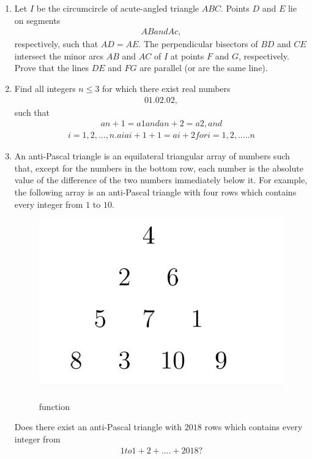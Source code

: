 \documentclass[12pt,-letter paper]{article}
\begin{document}
\begin{enumerate}
	\item Let $I$ be the circumcircle of acute-angled triangle $ABC$. Points $D$ and $E$ lie on segments \begin{align}AB and Ac,\end{align} respectively, such that $AD=AE$. The perpendicular bisectors of $BD$ and $CE$ intersect the minor arcs $AB$ and $AC$ of $I$ at points $F$ and $G$, respectively. Prove that the lines $DE$ and $FG$ are parallel (or are the same line).
\item Find all integers $n\leq3$ for which there exist real numbers \begin{align}01.02.02,\end{align} such that \begin{align} an+1=a1   and  an+2=a2,and \end{align} \begin{align}i=1,2,...,n. aiai+1+1=ai+2 for i=1,2,.....n\end{align}
\item An anti-Pascal triangle is an equilateral triangular array of numbers such that, except for the numbers in the bottom row, each number is the absolute value of the difference of the two numbers immediately below it. For example, the following array is an anti-Pascal triangle with four rows which contains every integer from $1$ to $10$.
	\begin{figure}[!ht]
		\includegraphics[width=\columnwidth]
		{./paid.jpg}
		\label{fig:fig1:0}
		\caption{function}
	\end{figure}
	Does there exist an anti-Pascal triangle with $2018$ rows which contains every integer from \begin{align}1 to 1+2 +....+2018?\end{align}

\end{enumerate}
\end{document}
